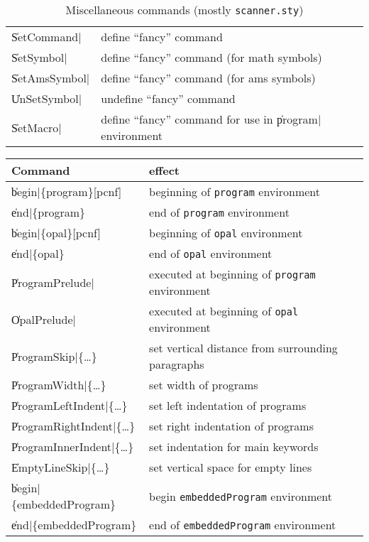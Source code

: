\begin{table}[htbp]
\begin{center}
\begin{tabular}[h]{|l|l|}
\|SetCommand|    & define ``fancy'' command \\
\|SetSymbol|     & define ``fancy'' command (for math symbols) \\
\|SetAmsSymbol|  & define ``fancy'' command (for ams symbols) \\
\|UnSetSymbol|   & undefine ``fancy'' command \\
\|SetMacro|    & define ``fancy'' command for use in \|program| environment \\
\hline
\end{tabular}
\caption{Miscellaneous commands (mostly \texttt{scanner.sty})}
\label{tab:Miscellaneous}
\end{center}
\end{table}




\begin{table}[htbp]
\begin{center}
\leavevmode
\begin{tabular}[h]{|l|l|}
\hline
Command & effect\\
\hline
\hline
\|begin|\{program\}[pcnf]   & beginning of \texttt{program} environment \\
\|end|\{program\}     & end of \texttt{program} environment \\
\|begin|\{opal\}[pcnf]& beginning of \texttt{opal} environment \\
\|end|\{opal\}        & end of \texttt{opal} environment \\
\|ProgramPrelude|     & executed at beginning of \texttt{program} environment\\
\|OpalPrelude|        & executed at beginning of \texttt{opal} environment\\
\hline
\|ProgramSkip|\{\ldots\} & set vertical distance from surrounding paragraphs\\
\|ProgramWidth|\{\ldots\}       & set width of programs \\
\|ProgramLeftIndent|\{\ldots\}  & set left indentation of programs\\
\|ProgramRightIndent|\{\ldots\} & set right indentation of programs\\
\|ProgramInnerIndent|\{\ldots\} & set indentation for main keywords\\
\|EmptyLineSkip|\{\ldots\}      & set vertical space for empty lines\\
\hline
\|begin|\{embeddedProgram\} & begin \texttt{embeddedProgram} environment\\
\|end|\{embeddedProgram\}& end of \texttt{embeddedProgram} environment \\

\end{tabular}
\end{center}
\end{table}

